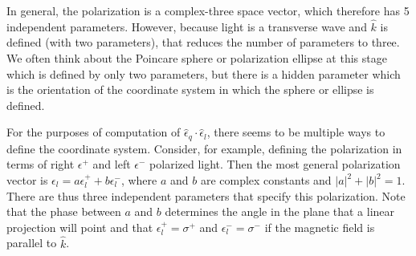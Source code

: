 \documentclass[final,5p,times,twocolumn]{elsarticle}
\begin{document}
In general, the polarization is a complex-three space vector, which therefore
has 5 independent parameters.  However, because light is a transverse wave and
$\hat{k}$ is defined (with two parameters), that reduces the number of
parameters to three.  We often think about the Poincare sphere or polarization
ellipse at this stage which is defined by only two parameters, but there is a
hidden parameter which is the orientation of the coordinate system in which
the sphere or ellipse is defined.

For the purposes of computation of $\hat{\epsilon}_q\cdot\hat{\epsilon}_l$,
there seems to be multiple ways to define the coordinate system.  Consider, for
example, defining the polarization in terms of right $\epsilon^+$ and left
$\epsilon^-$ polarized light.  Then the most general polarization vector is
$\epsilon_l = a \epsilon^+_l + b \epsilon^-_l$, where $a$ and $b$ are complex
constants and $|a|^2+|b|^2=1$.  There are thus three independent parameters that
specify this polarization.  Note that the phase between $a$ and $b$ determines
the angle in the plane that a linear projection will point and that
$\epsilon^+_l=\sigma^+$ and $\epsilon^-_l=\sigma^-$ if the magnetic field is
parallel to $\hat{k}$.
\end{document}
